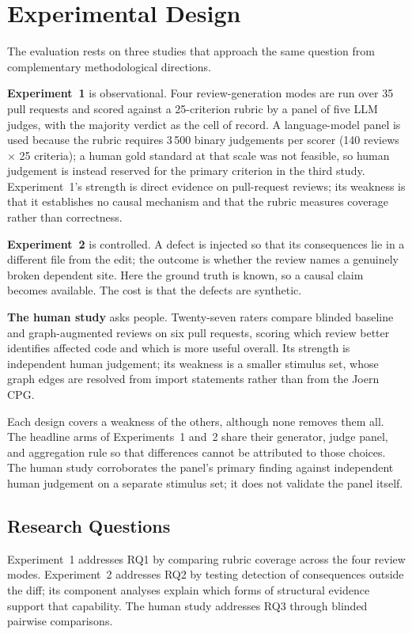 \section{Experimental Design}

The evaluation rests on three studies that approach the same question from
complementary methodological directions.

\textbf{Experiment~1} is observational. Four review-generation modes are run
over 35 pull requests and scored against a 25-criterion rubric by a panel
of five LLM judges, with the majority verdict as the cell of record. A
language-model panel is used because the rubric requires 3\,500 binary
judgements per scorer (140 reviews $\times$ 25 criteria); a human gold
standard at that scale was not feasible, so human judgement is instead
reserved for the primary criterion in the third study. Experiment~1's
strength is direct evidence on pull-request reviews; its weakness is that it
establishes no causal mechanism and that the rubric measures coverage rather
than correctness.

\textbf{Experiment~2} is controlled. A defect is injected so that its
consequences lie in a different file from the edit; the outcome is whether the
review names a genuinely broken dependent site. Here the ground truth is known,
so a causal claim becomes available. The cost is that the defects are synthetic.

\textbf{The human study} asks people. Twenty-seven raters compare blinded
baseline and graph-augmented reviews on six pull requests, scoring
which review better identifies affected code and which is more useful overall.
Its strength is independent human judgement; its weakness is a smaller
stimulus set,
whose graph edges are resolved from import statements rather than from the
Joern CPG.

Each design covers a weakness of the others, although none removes them
all. The headline arms of Experiments~1 and~2 share their generator, judge
panel, and aggregation rule so that differences cannot be attributed to
those choices. The human study corroborates the panel's primary finding
against independent human judgement on a separate stimulus set; it does not
validate the panel itself.

\subsection{Research Questions}
\label{sec:rqs-addressed}

Experiment~1 addresses RQ1 by comparing rubric coverage across the four review
modes. Experiment~2 addresses RQ2 by testing detection of consequences outside
the diff; its component analyses explain which forms of structural evidence
support that capability. The human study addresses RQ3 through blinded
pairwise comparisons.

